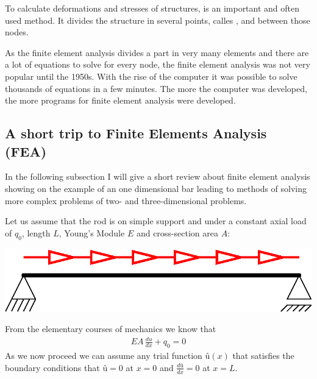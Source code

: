 To calculate deformations and stresses of structures,  is an important and often used method. It divides the structure in several points, calles , and  between those nodes. 
\bigskip

As the finite element analysis divides a part in very many elements and there are a lot of equations to solve for every node, the finite element analysis was not very popular until the 1950s. With the rise of the computer it was possible to solve thousands of equations in a few minutes. The more the computer was developed, the more programs for finite element analysis were developed.

\subsection{A short trip to Finite Elements Analysis (FEA)}
In the following subsection I will give a short review about finite element analysis showing on the example of an one dimensional bar leading to methods of solving more complex problems of two- and three-dimensional problems.
\bigskip

Let us assume that the rod is on simple support and under a constant axial load of $q_0$, length $L$, Young's Module $E$ and cross-section area $A$:
\bigskip

\begin{center}
\includegraphics[scale=1]{OneDimensionalBar.eps}
\end{center}
\bigskip
From the elementary courses of mechanics we know that
\begin{align}
EA\,\frac{du}{dx}+q_0=0 \label{Rod_Main}
\end{align}
As we now proceed we can assume any trial function $û(x)$ that satisfies the boundary conditions that $û=0$ at $x=0$ and $\frac{dû}{dx}=0$ at $x=L$.

